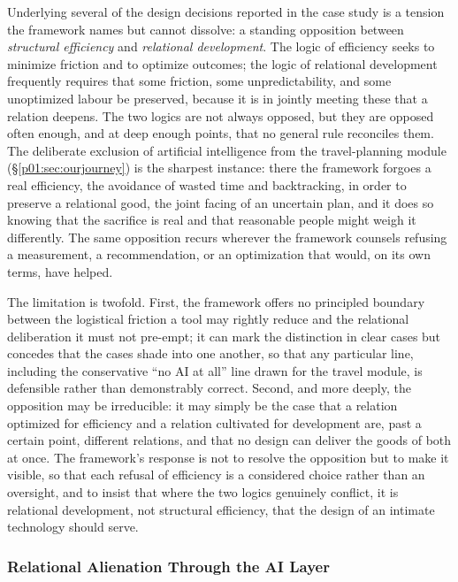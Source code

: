 \documentclass[11pt,a4paper]{article}
\begin{document}
Underlying several of the design decisions reported in the case study is a tension the framework names but cannot dissolve: a standing opposition between \emph{structural efficiency} and \emph{relational development}. The logic of efficiency seeks to minimize friction and to optimize outcomes; the logic of relational development frequently requires that some friction, some unpredictability, and some unoptimized labour be preserved, because it is in jointly meeting these that a relation deepens. The two logics are not always opposed, but they are opposed often enough, and at deep enough points, that no general rule reconciles them. The deliberate exclusion of artificial intelligence from the travel-planning module (§\ref{p01:sec:ourjourney}) is the sharpest instance: there the framework forgoes a real efficiency, the avoidance of wasted time and backtracking, in order to preserve a relational good, the joint facing of an uncertain plan, and it does so knowing that the sacrifice is real and that reasonable people might weigh it differently. The same opposition recurs wherever the framework counsels refusing a measurement, a recommendation, or an optimization that would, on its own terms, have helped.

The limitation is twofold. First, the framework offers no principled boundary between the logistical friction a tool may rightly reduce and the relational deliberation it must not pre-empt; it can mark the distinction in clear cases but concedes that the cases shade into one another, so that any particular line, including the conservative ``no AI at all'' line drawn for the travel module, is defensible rather than demonstrably correct. Second, and more deeply, the opposition may be irreducible: it may simply be the case that a relation optimized for efficiency and a relation cultivated for development are, past a certain point, different relations, and that no design can deliver the goods of both at once. The framework's response is not to resolve the opposition but to make it visible, so that each refusal of efficiency is a considered choice rather than an oversight, and to insist that where the two logics genuinely conflict, it is relational development, not structural efficiency, that the design of an intimate technology should serve.

\subsubsection{Relational Alienation Through the AI Layer}
\end{document}
